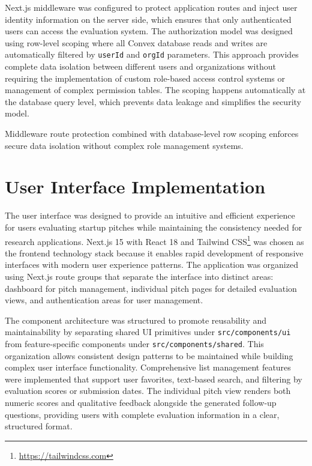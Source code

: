 Next.js middleware was configured to protect application routes and inject user identity information on the server side, which ensures that only authenticated users can access the evaluation system. The authorization model was designed using row-level scoping where all Convex database reads and writes are automatically filtered by \texttt{userId} and \texttt{orgId} parameters. This approach provides complete data isolation between different users and organizations without requiring the implementation of custom role-based access control systems or management of complex permission tables. The scoping happens automatically at the database query level, which prevents data leakage and simplifies the security model.

Middleware route protection combined with database-level row scoping enforces secure data isolation without complex role management systems.

\section{User Interface Implementation}

The user interface was designed to provide an intuitive and efficient experience for users evaluating startup pitches while maintaining the consistency needed for research applications. Next.js 15 with React 18 and Tailwind CSS\footnote{\url{https://tailwindcss.com}} was chosen as the frontend technology stack because it enables rapid development of responsive interfaces with modern user experience patterns. The application was organized using Next.js route groups that separate the interface into distinct areas: dashboard for pitch management, individual pitch pages for detailed evaluation views, and authentication areas for user management.

The component architecture was structured to promote reusability and maintainability by separating shared UI primitives under \texttt{src/components/ui} from feature-specific components under \texttt{src/components/shared}. This organization allows consistent design patterns to be maintained while building complex user interface functionality. Comprehensive list management features were implemented that support user favorites, text-based search, and filtering by evaluation scores or submission dates. The individual pitch view renders both numeric scores and qualitative feedback alongside the generated follow-up questions, providing users with complete evaluation information in a clear, structured format.

